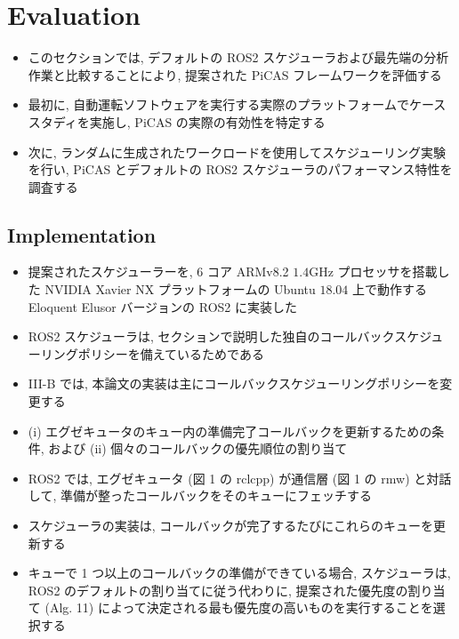 
\section{Evaluation}
\label{sec: evaluation}

\begin{frame}{}
    \begin{itemize}
        \item このセクションでは, デフォルトの ROS2 スケジューラおよび最先端の分析作業と比較することにより, 提案された PiCAS フレームワークを評価する
\item 最初に, 自動運転ソフトウェアを実行する実際のプラットフォームでケーススタディを実施し, PiCAS の実際の有効性を特定する
\item 次に, ランダムに生成されたワークロードを使用してスケジューリング実験を行い, PiCAS とデフォルトの ROS2 スケジューラのパフォーマンス特性を調査する
    \end{itemize}
\end{frame}

\subsection{Implementation}
\label{ssec: implementation}

\begin{frame}{}
    \begin{itemize}
        \item 提案されたスケジューラーを, 6 コア ARMv8.2 $1.4 \mathrm{GHz}$ プロセッサを搭載した NVIDIA Xavier NX プラットフォームの Ubuntu $18.04$ 上で動作する Eloquent Elusor バージョンの ROS2 に実装した
\item ROS2 スケジューラは, セクションで説明した独自のコールバックスケジューリングポリシーを備えているためである
\item III-B では, 本論文の実装は主にコールバックスケジューリングポリシーを変更する
\item (i) エグゼキュータのキュー内の準備完了コールバックを更新するための条件, および (ii) 個々のコールバックの優先順位の割り当て
\item ROS2 では, エグゼキュータ (図 1 の rclcpp) が通信層 (図 1 の rmw) と対話して, 準備が整ったコールバックをそのキューにフェッチする
\item スケジューラの実装は, コールバックが完了するたびにこれらのキューを更新する
\item キューで 1 つ以上のコールバックの準備ができている場合, スケジューラは, ROS2 のデフォルトの割り当てに従う代わりに, 提案された優先度の割り当て (Alg. 11) によって決定される最も優先度の高いものを実行することを選択する
    \end{itemize}
\end{frame}

